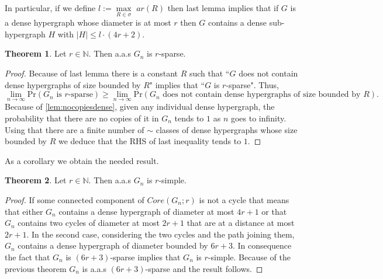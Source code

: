 \documentclass[12pt,notitlepage,a4paper]{article}
\theoremstyle{definition}
\newtheorem{theorem}{Theorem}[section]
\newcommand{\N}{\mathbb{N}}
\newcommand{\Ln}{\lim\limits_{n\to \infty}}
\newcommand{\sep}{\noindent\rule{2cm}{0.4pt}}
\begin{document}
In particular, if we define $l:=\max\limits_{R\in \sigma} \,\, ar(R)$
then last lemma implies that if $G$ is a dense hypergraph whose
diameter is at most $r$ then $G$ contains a dense sub-hypergraph
$H$ with $|H|\leq l\cdot (4r+2)$.\par


\begin{theorem} \label{thm:sparse}
	Let $r\in \N$. Then a.a.s $G_n$ is $r$-sparse. 
\end{theorem}
\begin{proof}
	Because of last lemma there is a constant $R$ such that 
	``$G$ does not contain dense hypergraphs of size bounded by $R$" implies
	that ``$G$ is $r$-sparse". Thus,
	\[ \Ln \mathrm{Pr}\left( G_n \text{ is } r \text{-sparse}  \right)
	\geq \Ln \mathrm{Pr} \left( G_n \text{ does not contain dense 
	hypergraphs of size bounded by } R\right).\] 
	Because of	\cref{lem:nocopiesdense}, given any individual dense hypergraph,
	the probability that there are no copies
	of it in $G_n$ tends to $1$ as $n$ goes to infinity. Using that
	there are a finite number of $\sim$ classes of dense hypergraphs whose
	size bounded by	$R$ we deduce that the RHS of last inequality tends to $1$. 
\end{proof}
As a corollary we obtain the needed result. 
\begin{theorem}\label{cor:simple}
	Let $r\in \N$. Then a.a.s $G_n$ is $r$-simple.
\end{theorem}
\begin{proof}
	If some connected component of $Core(G_n;r)$ is not a cycle that means
	that either $G_n$ contains a dense hypergraph of diameter at most $4r+1$
	or that $G_n$ contains two cycles of diameter at most $2r+1$ that are at
	a distance at most $2r+1$. In the second case, considering the two cycles
	and the path joining them, $G_n$ contains a dense hypergraph of diameter
	bounded by $6r+3$. In consequence the fact that $G_n$ is $(6r+3)$-sparse
	implies that $G_n$ is $r$-simple. Because of the previous theorem 
	$G_n$ is a.a.s $(6r+3)$-sparse and the result follows. 
\end{proof}
\end{document}
